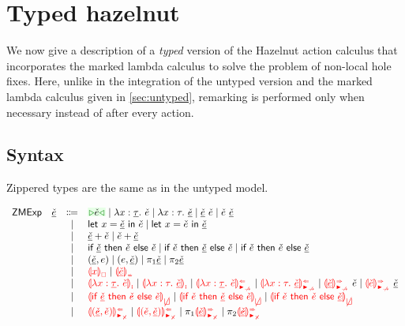 \documentclass[formalism.tex]{subfiles}
\begin{document}






\section{Typed hazelnut}
\label{sec:typed}
We now give a description of a \emph{typed} version of the Hazelnut action calculus that
incorporates the marked lambda calculus to solve the problem of non-local hole fixes. Here, unlike
in the integration of the untyped version and the marked lambda calculus given in
\cref{sec:untyped}, remarking is performed only when necessary instead of after every action.

\nomechanization{}

\subsection{Syntax}
\label{sec:typed-syntax}
Zippered types are the same as in the untyped model.

\[\begin{array}{rrcl}
  \ZCMName & \ZCMV & \Coloneqq & \ZCCursor{\ECMV} \mid \ZCLamT{x}{\ZTMV}{\ECMV} \mid \ZCLamE{x}{\TMV}{\ZCMV} \mid \ZCApL{\ZCMV}{\ECMV} \mid \ZCApR{\ECMV}{\ZCMV} \\
           &       & \mid         & \ZCLetL{x}{\ZCMV}{\ECMV} \mid \ZCLetR{x}{\ECMV}{\ZCMV} \\
           &       & \mid         & \ZCPlusL{\ZCMV}{\ECMV} \mid \ZCPlusR{\ECMV}{\ZCMV} \\
           &       & \mid         & \ZCIfC{\ZCMV}{\ECMV}{\ECMV} \mid \ZCIfL{\ECMV}{\ZCMV}{\ECMV} \mid \ZCIfR{\ECMV}{\ECMV}{\ZCMV} \\
           &       & \mid         & \ZCPairL{\ZCMV}{\EMV} \mid \ZCPairR{\EMV}{\ZCMV} \mid \ZCProjL{\ZCMV} \mid \ZCProjR{\ZCMV} \\
           &       & \mid         & \ZCFree{x} \mid \ZCInconType{\ZCMV} \\
           &       & \mid         & \ZCLamInconAscT{x}{\ZTMV}{\ECMV} \mid \ZCLamInconAscE{x}{\TMV}{\ZCMV}
                     \mid           \ZCLamAnaNonMatchedArrowT{x}{\ZTMV}{\ECMV} \mid \ZCLamAnaNonMatchedArrowE{x}{\TMV}{\ZCMV}
                     \mid           \ZCApSynNonMatchedArrowL{\ZCMV}{\ECMV} \mid \ZCApSynNonMatchedArrowR{\ECMV}{\ZCMV} \\
           &       & \mid         & \ZCInconBrC{\ZCMV}{\ECMV}{\ECMV} \mid \ZCInconBrL{\ECMV}{\ZCMV}{\ECMV} \mid \ZCInconBrR{\ECMV}{\ECMV}{\ZCMV} \\
           &       & \mid         & \ZCPairAnaNonMatchedProdL{\ZCMV}{\ECMV} \mid \ZCPairAnaNonMatchedProdR{\ECMV}{\ZCMV}
                     \mid           \ZCProjLSynNonMatchedProd{\ZCMV} \mid \ZCProjRSynNonMatchedProd{\ZCMV}
\end{array}\]
\end{document}
